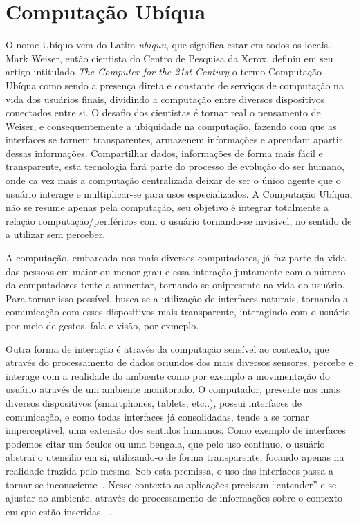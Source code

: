 \documentclass[12pt,a4paper,compsoc]{IEEEtran}
\begin{document}
\section{Computação Ubíqua}

  O nome Ubíquo vem do Latim \textit{ubiquu}, que significa estar em todos os locais. Mark Weiser,
  então cientista do Centro de Pesquisa da Xerox, definiu em seu artigo intitulado  \textit{The
  Computer for the 21st Century} o termo Computação Ubíqua como sendo a presença direta e constante
  de serviços de computação na vida dos usuários finais, dividindo a computação entre diversos
  dispositivos conectados entre si. O desafio dos cientistas é tornar real o pensamento de Weiser,
  e consequentemente a ubiquidade na computação, fazendo com que as interfaces se tornem
  transparentes, armazenem informações e aprendam apartir dessas informações. Compartilhar dados,
  informações de forma mais fácil e transparente, esta tecnologia fará parte do processo de
  evolução do ser humano, onde ca vez mais a computação centralizada deixar de ser o único agente
  que o usuário interage e multiplicar-se para usos especializados. A Computação Ubíqua,  não se
  resume apenas pela computação, seu objetivo é integrar totalmente a relação
  computação/periféricos com o usuário tornando-se  invisível, no sentido de a utilizar sem 
  perceber.
  
  A computação, embarcada nos mais diversos computadores, já faz parte da vida das pessoas em maior
  ou menor grau e essa interação juntamente com o número da computadores tente a aumentar,
  tornando-se onipresente na vida do usuário. Para tornar isso possível, busca-se a utilização de
  interfaces naturais, tornando a comunicação com esses dispositivos mais transparente, interagindo
  com o usuário por meio de gestos, fala e visão, por exmeplo.
  
  Outra forma de interação é através da computação sensível ao contexto, que através do 
  processamento de dados oriundos dos mais diversos sensores, percebe e interage com a realidade do
  ambiente como por exemplo a movimentação do usuário através de um ambiente monitorado.
  O computador, presente nos mais diversos dispositivos (smartphones, tablets, etc..), possui 
  interfaces de comunicação, e como todas interfaces já consolidadas, tende a se tornar 
  imperceptivel, uma extensão dos sentidos humanos. Como exemplo de interfaces podemos citar um
  óculos ou uma bengala, que pelo uso contínuo, o usuário abstrai o utensilio em si, utilizando-o
  de forma transparente, focando apenas na realidade trazida pelo mesmo. Sob esta premissa, o uso
  das interfaces passa a tornar-se inconsciente~\cite{weiser1993}. Nesse contexto as aplicações 
  precisam ``entender'' e se ajustar ao ambiente, através do processamento de informações sobre o
  contexto em que estão inseridas ~\cite{maciel2004}.
  
\end{document}
